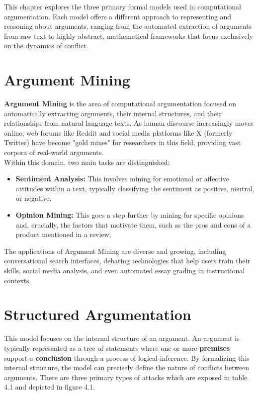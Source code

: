 \documentclass{scrbook}
\begin{document}
This chapter explores the three primary formal models used in computational argumentation. Each model offers a different approach to representing and reasoning about arguments, ranging from the automated extraction of arguments from raw text to highly abstract, mathematical frameworks that focus exclusively on the dynamics of conflict.

\section{Argument Mining}

\textbf{Argument Mining} is the area of computational argumentation focused on automatically extracting arguments, their internal structures, and their relationships from natural language texts. As human discourse increasingly moves online, web forums like Reddit and social media platforms like X (formerly Twitter) have become "gold mines" for researchers in this field, providing vast corpora of real-world arguments. \\

Within this domain, two main tasks are distinguished:

\begin{itemize}
    \item 
    \textbf{Sentiment Analysis:} This involves mining for emotional or affective attitudes within a text, typically classifying the sentiment as positive, neutral, or negative.

    \item 
    \textbf{Opinion Mining:} This goes a step further by mining for specific opinions and, crucially, the factors that motivate them, such as the pros and cons of a product mentioned in a review.
\end{itemize}

The applications of Argument Mining are diverse and growing, including conversational search interfaces, debating technologies that help users train their skills, social media analysis, and even automated essay grading in instructional contexts.

\section{Structured Argumentation}

This model focuses on the internal structure of an argument. An argument is typically represented as a tree of statements where one or more \textbf{premises} support a \textbf{conclusion} through a process of logical inference. By formalizing this internal structure, the model can precisely define the nature of conflicts between arguments. There are three primary types of attacks which are exposed in table 4.1 and depicted in figure 4.1.
\end{document}
